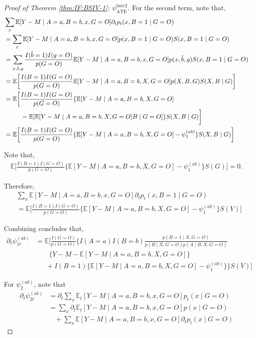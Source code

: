 \documentclass[10pt]{article}
\begin{document}
\begin{proof}[Proof of Theorem \ref{thm:IF:BSIV-1}: $\psi_{\text{ATE}}^{\text{bsiv2}}$]
For the second term, note that,
{\footnotesize \begin{align*}
    &\sum_{x}\mathbb{E}[Y-M\mid A=a,B=b,x,G=O]\partial_tp_t(x,B=1\mid  G=O)\\
    &=\sum_{x}\mathbb{E}[Y-M\mid A=a,B=b,x,G=O]p(x,B=1\mid G=O)S(x,B=1\mid G=O)\\
    &=\sum_{x,\Tilde{b},g}\frac{I(\Tilde{b}=1)I(g=O)}{p(G=O)}\mathbb{E}[Y-M\mid A=a,B=b,x,G=O]p(x,\Tilde{b}, g)S(x,B=1\mid G=O)\\
    &=\mathbb{E}\bigg[\frac{I(B=1)I(G=O)}{p(G=O)}\mathbb{E}[Y-M\mid A=a,B=b,X,G=O]p(X,B, G)S(X,B\mid G)\bigg]\\
    &=\mathbb{E}\bigg[\frac{I(B=1)I(G=O)}{p(G=O)}\{\mathbb{E}[Y-M\mid A=a,B=b,X,G=O]\\
    &~~~~~~~~-\mathbb{E}[\mathbb{E}[Y-M\mid A=a,B=b,X,G=O]B\mid G=O]\}S(X,B\mid G)\bigg]\\
    &=\mathbb{E}\bigg[\frac{I(B=1)I(G=O)}{p(G=O)}\{\mathbb{E}[Y-M\mid A=a,B=b,X,G=O]-\psi_1^{(ab)}\}S(X,B\mid G)\bigg]
\end{align*}}

Note that,
\begin{align*}
    \mathbb{E}\bigg[\frac{I(B=1)I(G=O)}{p(G=O)}\{\mathbb{E}[Y-M\mid A=a,B=b,X,G=O]-\psi_1^{(ab)}\}S(G)\bigg]=0.
\end{align*}

Therefore,
\begin{align*}
    &\sum_{x}\mathbb{E}[Y-M\mid A=a,B=b,x,G=O]\partial_tp_t(x,B=1\mid G=O)\\
    &=\mathbb{E}\bigg[\frac{I(B=1)I(G=O)}{p(G=O)}\{\mathbb{E}[Y-M\mid A=a,B=b,X,G=O]-\psi_1^{(ab)}\}S(V)\bigg]
\end{align*}

Combining concludes that,
\begin{align*}
    \partial_t\psi_{1t}^{(ab)}&=\mathbb{E}\bigg[\frac{I(G=O)}{p(G=O)}\bigg\{I(A=a)I(B=b)\frac{p(B=1\mid X,G=O)}{p(B\mid X,G=O)p(A\mid B, X,G=O)}\\
    &\ \ \ \ \ \ \ \ \ \{Y-M-\mathbb{E}[Y-M\mid A=a,B=b,X,G=O]\}\\
    &\ \ \ \ \ \ \ +I(B=1)\{\mathbb{E}[Y-M\mid A=a,B=b,X,G=O]-\psi_1^{(ab)}\}\bigg\}S(V)\bigg]
\end{align*}

For $\psi_2^{(ab)}$, note that
\begin{align*}
    \partial_t\psi_{2t}^{(ab)}&=\partial_t\sum_{x}\mathbb{E}_t[Y-M\mid A=a,B=b,x,G=O]p_t(x\mid G=O)\\
    &=\sum_{x}\partial_t\mathbb{E}_t[Y-M\mid A=a,B=b,x,G=O]p(x\mid G=O)\\
    &\ \ \ \ + \sum_{x}\mathbb{E}[Y-M\mid A=a,B=b,x,G=O]\partial_tp_t(x\mid G=O)
\end{align*}


\end{proof}
\end{document}
